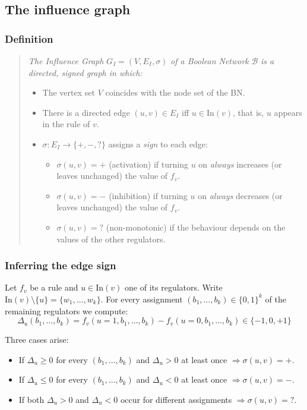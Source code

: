 \documentclass[oneside,final]{hcmut-report}
\begin{document}
\subsection{The influence graph}\label{subsec:influence-graph}

\subsubsection{Definition}

\begin{quote}
\textit{The Influence Graph} $G_I = (V, E_I, \sigma)$ \textit{of a Boolean Network} $\mathcal{B}$ \textit{is a directed, signed graph in which:}
\begin{itemize}[leftmargin=*]
    \item The vertex set $V$ coincides with the node set of the BN.
    \item There is a directed edge $(u, v) \in E_I$ iff $u \in \mathrm{In}(v)$, that is, $u$ appears in the rule of $v$.
    \item $\sigma : E_I \to \{+, -, ?\}$ assigns a \textit{sign} to each edge:
    \begin{itemize}
        \item $\sigma(u,v) = +$ (activation) if turning $u$ on \textit{always} increases (or leaves unchanged) the value of $f_v$.
        \item $\sigma(u,v) = -$ (inhibition) if turning $u$ on \textit{always} decreases (or leaves unchanged) the value of $f_v$.
        \item $\sigma(u,v) = ?$ (non-monotonic) if the behaviour depends on the values of the other regulators.
    \end{itemize}
\end{itemize}
\end{quote}

\subsubsection{Inferring the edge sign}

Let $f_v$ be a rule and $u \in \mathrm{In}(v)$ one of its regulators. Write $\mathrm{In}(v) \setminus \{u\} = \{w_1, \ldots, w_k\}$. For every assignment $(b_1, \ldots, b_k) \in \{0,1\}^k$ of the remaining regulators we compute:
$$\Delta_u(b_1,\ldots,b_k) = f_v(u=1, b_1,\ldots,b_k) - f_v(u=0, b_1,\ldots,b_k) \in \{-1, 0, +1\}$$

Three cases arise:
\begin{itemize}[leftmargin=*]
    \item If $\Delta_u \geq 0$ for every $(b_1,\ldots,b_k)$ and $\Delta_u > 0$ at least once $\Rightarrow \sigma(u,v) = +$.
    \item If $\Delta_u \leq 0$ for every $(b_1,\ldots,b_k)$ and $\Delta_u < 0$ at least once $\Rightarrow \sigma(u,v) = -$.
    \item If both $\Delta_u > 0$ and $\Delta_u < 0$ occur for different assignments $\Rightarrow \sigma(u,v) = ?$.
\end{itemize}
\end{document}
